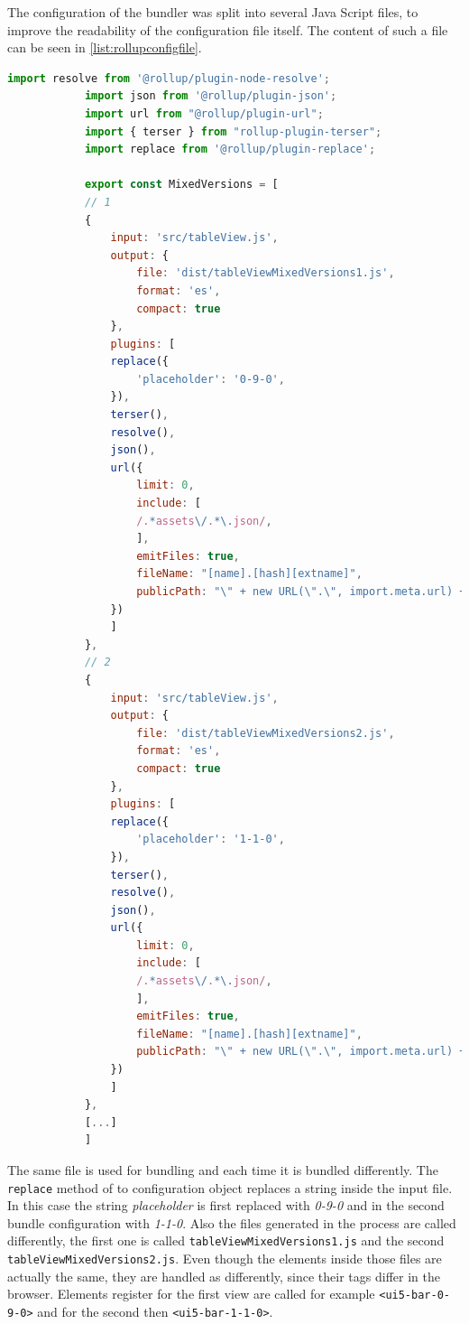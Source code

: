 		The configuration of the bundler was split into several Java Script files, to improve the readability of the configuration file itself. The content of such a file can be seen in \ref{list:rollupconfigfile}.
		
		\begin{lstlisting}[language=JavaScript, caption=Actual configuration for the \texttt{rollup.config.js}, label=list:rollupconfigfile, xleftmargin=.01\textwidth, xrightmargin=.01\textwidth]
			import resolve from '@rollup/plugin-node-resolve';
			import json from '@rollup/plugin-json';
			import url from "@rollup/plugin-url";
			import { terser } from "rollup-plugin-terser";
			import replace from '@rollup/plugin-replace';
			
			export const MixedVersions = [
			// 1
			{
				input: 'src/tableView.js',
				output: {
					file: 'dist/tableViewMixedVersions1.js',
					format: 'es',
					compact: true
				},
				plugins: [
				replace({
					'placeholder': '0-9-0',
				}),
				terser(),
				resolve(),
				json(),
				url({
					limit: 0,
					include: [
					/.*assets\/.*\.json/,
					],
					emitFiles: true,
					fileName: "[name].[hash][extname]",
					publicPath: "\" + new URL(\".\", import.meta.url) + \"", // relative configuration for assets (TBD with UI5 Web Components team)
				})
				]
			},
			// 2
			{
				input: 'src/tableView.js',
				output: {
					file: 'dist/tableViewMixedVersions2.js',
					format: 'es',
					compact: true
				},
				plugins: [
				replace({
					'placeholder': '1-1-0',
				}),
				terser(),
				resolve(),
				json(),
				url({
					limit: 0,
					include: [
					/.*assets\/.*\.json/,
					],
					emitFiles: true,
					fileName: "[name].[hash][extname]",
					publicPath: "\" + new URL(\".\", import.meta.url) + \"", // relative configuration for assets (TBD with UI5 Web Components team)
				})
				]
			},
			[...]
			]
		\end{lstlisting}
		
		The same file is used for bundling and each time it is bundled differently. The \texttt{replace} method of to configuration object replaces a string inside the input file. In this case the string \textit{placeholder} is first replaced with \textit{0-9-0} and in the second bundle configuration with \textit{1-1-0}. Also the files generated in the process are called differently, the first one is called \texttt{tableViewMixedVersions1.js} and the second \texttt{tableViewMixedVersions2.js}.
		Even though the elements inside those files are actually the same, they are handled as differently, since their tags differ in the browser. Elements register for the first view are called for example \texttt{<ui5-bar-0-9-0>} and for the second then \texttt{<ui5-bar-1-1-0>}.
		
